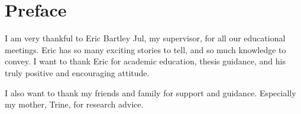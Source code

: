 \chapter*{Preface} 
I am very thankful to Eric Bartley Jul, my supervisor, for all our educational meetings. Eric has so many exciting stories to tell, and so much knowledge to convey. I want to thank Eric for academic education, thesis guidance, and his truly positive and encouraging attitude. 

I also want to thank my friends and family for support and guidance. Especially my mother, Trine, for research advice. 
